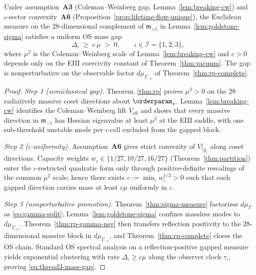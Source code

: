 \begin{theorem}
\label{thm:thread3-mass-gap}
Under assumption~\textbf{A3} (Coleman--Weinberg gap,
Lemma~\ref{lem:breaking-cw}) and $\iota$-sector convexity~\textbf{A6}
(Proposition~\ref{prop:lifetime-flow-unique}), the Euclidean measure on the
$28$-dimensional complement of $\mathfrak{m}_{+1}$ in
Lemma~\ref{lem:goldstone-sigma} satisfies a uniform OS mass gap
\begin{equation}\label{eq:thread3-mass-gap}
  \Delta_\iota \;\ge\; c\,\mu \;>\; 0,
  \qquad
  \iota\in\mathcal{I}=\{1,2,3\},
\end{equation}
where $\mu^2$ is the Coleman--Weinberg scale of Lemma~\ref{lem:breaking-cw}
and $c>0$ depends only on the EIII coercivity constant of
Theorem~\ref{thm:vacuum}. The gap is nonperturbative on the observable factor
$d\mu_{\Gamma_{-1}}$ of Theorem~\ref{thm:rp-complete}.
\end{theorem}

\begin{proof}
\emph{Step 1 (semiclassical gap).}
Theorem~\ref{thm:rp} proves $\mu^2>0$ on the $28$ radiatively massive coset
directions about $\orderparam_\star$. Lemma~\ref{lem:breaking-cw} identifies
the Coleman--Weinberg lift $V_{\mathrm{eff}}$ and shows that every massive
direction in $\mathfrak{m}_{-1}$ has Hessian eigenvalue at least $\mu^2$ at
the EIII saddle, with one sub-threshold unstable mode per $\iota$-cell excluded
from the gapped block.

\emph{Step 2 ($\iota$-uniformity).}
Assumption~\textbf{A6} gives strict convexity of $V|_{\mathcal{S}_\iota}$ along
coset directions. Capacity weights $w_\iota\in\{1/27,10/27,16/27\}$
(Theorem~\ref{thm:partition}) enter the $\iota$-restricted quadratic form only
through positive-definite rescalings of the common $\mu^2$ scale; hence there
exists $c:=\min_\iota w_\iota^{1/2}>0$ such that each gapped direction carries
mass at least $c\mu$ uniformly in $\iota$.

\emph{Step 3 (nonperturbative promotion).}
Theorem~\ref{thm:sigma-measure} factorizes $d\mu_\Gamma$ as
\eqref{eq:gamma-split}; Lemma~\ref{lem:goldstone-sigma} confines massless modes
to $d\mu_{\Gamma_{+1}}$. Theorem~\ref{thm:rp-gamma-neg} then transfers
reflection positivity to the $28$-dimensional massive block in
$d\mu_{\Gamma_{-1}}$, and Theorem~\ref{thm:rp-complete} closes the OS chain.
Standard OS spectral analysis on a reflection-positive gapped measure yields
exponential clustering with rate $\Delta_\iota\ge c\mu$ along the observer
clock $\tau_\iota$, proving \eqref{eq:thread3-mass-gap}.
\end{proof}


